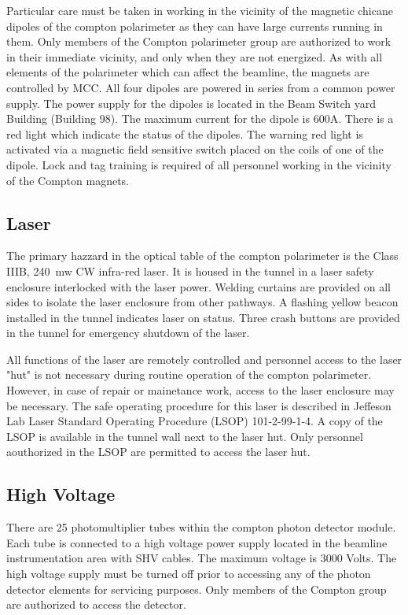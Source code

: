 {\begin{safetyen}{10}{15}
Particular care must be taken in working in the vicinity of the
magnetic chicane dipoles of the compton polarimeter as they can have large currents
running in them. Only members of the Compton polarimeter group are
authorized to work in their immediate vicinity, and only when they are
not energized. As with all elements of the
polarimeter which can
affect the beamline, the magnets are controlled by MCC. All four dipoles are
powered in series from a common power supply. The power supply for
the dipoles is located in the Beam Switch yard Building (Building 98).
The maximum current for the dipole is 600A. There is a
red light which indicate the status of the dipoles. The warning red
light is activated via a magnetic field sensitive switch placed
on the coils of one of the dipole. Lock and tag training is required of all personnel working
in the vicinity of the Compton magnets. \\

\subsection{Laser}
The primary hazzard in the optical table of the compton polarimeter is the Class IIIB, 240~mw 
CW infra-red laser.
It is housed in the tunnel in a laser safety enclosure interlocked with the laser power.
Welding curtains are provided on all sides to isolate the laser enclosure from other pathways.
A flashing yellow beacon installed in the tunnel indicates laser on status. Three crash  buttons
are provided in the tunnel for emergency shutdown of the laser.

All functions of the laser are remotely controlled and personnel access to the laser "hut" 
is not necessary during routine operation of the compton polarimeter. However, in case of repair  
or mainetance work, access to the laser enclosure may be necessary. The safe operating procedure for this laser is described in 
Jeffeson Lab Laser Standard Operating Procedure (LSOP) 101-2-99-1-4. A copy of the LSOP is 
available in the tunnel wall next to the laser hut. Only personnel aouthorized in the LSOP are
permitted to access the laser hut.
 

\subsection{High Voltage}

There are 25 photomultiplier tubes within the compton photon detector module.
Each tube is connected to a high voltage power supply located in the beamline instrumentation area
with SHV cables. The maximum voltage is 3000 Volts.
The high voltage supply must be turned off prior to accessing  any of the photon detector elements
for servicing purposes. Only members of the Compton group
are authorized to access the  detector.\\


\end{safetyen}}
